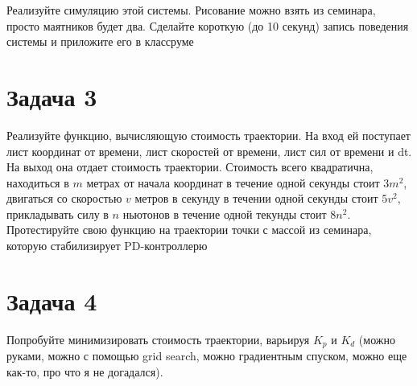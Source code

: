 \documentclass{article}
\begin{document}
Реализуйте симуляцию этой системы. Рисование можно взять из семинара, просто маятников будет два. Сделайте короткую (до 10 секунд) запись поведения системы и приложите его в классруме

\section*{Задача 3}

Реализуйте функцию, вычисляющую стоимость траектории.
На вход ей поступает лист координат от времени, лист скоростей от времени, лист сил от времени и dt. На выход она отдает стоимость траектории.
Стоимость всего квадратична, находиться в $m$ метрах от начала координат в течение одной секунды стоит $3 m^2$, двигаться со скоростью $v$ метров в секунду в течении одной секунды стоит $5 v^2$, прикладывать силу в $n$ ньютонов в течение одной текунды стоит $8 n^2$.
Протестируйте свою функцию на траектории точки с массой из семинара, которую стабилизирует PD-контроллерю

\section*{Задача 4}

Попробуйте минимизировать стоимость траектории, варьируя $K_p$ и $K_d$ (можно руками, можно с помощью grid search, можно градиентным спуском, можно еще как-то, про что я не догадался).
\end{document}
